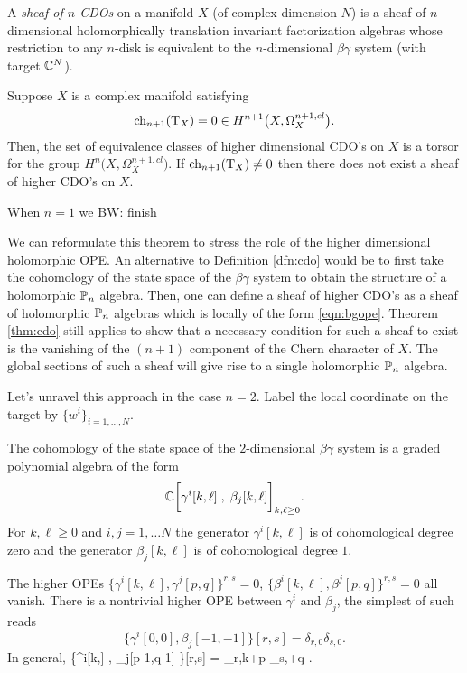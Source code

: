 \documentclass[11pt]{amsart}
\def\brian#1{{\textcolor{blue!65!red}{BW: {#1}}}}
\begin{document}
\begin{dfn}\label{dfn:cdo}
A {\em sheaf of $n$-CDOs} on a manifold $X$ (of complex dimension $N$) is a sheaf of $n$-dimensional holomorphically translation invariant factorization algebras whose restriction to any $n$-disk is equivalent to the $n$-dimensional $\beta\gamma$ system (with target $\mathbb C^N$). 
\end{dfn}

\begin{thm}\label{thm:cdo}
Suppose $X$ is a complex manifold satisfying 
\[
{\rm ch}_{n+1} ({\rm T}_X) = 0 \in H^{n+1} \big(X , \Omega^{n+1,cl}_X\big).
\]
Then, the set of equivalence classes of higher dimensional CDO's on $X$ is a torsor for the group $H^n \big(X , \Omega^{n+1, cl}_X\big)$. 
If ${\rm ch}_{n+1}({\rm T}_X) \ne 0$ then there does not exist a sheaf of higher CDO's on $X$. 
\end{thm}

\begin{rmk}
When $n=1$ we \cite{GGW} \brian{finish}
\end{rmk} 

We can reformulate this theorem to stress the role of the higher dimensional holomorphic OPE. 
An alternative to Definition \ref{dfn:cdo} would be to first take the cohomology of the state space of the $\beta\gamma$ system to obtain the structure of a holomorphic $\mathbb P_n$ algebra.
Then, one can define a sheaf of higher CDO's as a sheaf of holomorphic $\mathbb P_n$ algebras which is locally of the form \eqref{eqn:bgope}. 
Theorem \ref{thm:cdo} still applies to show that a necessary condition for such a sheaf to exist is the vanishing of the $(n+1)$ component of the Chern character of $X$. 
The global sections of such a sheaf will give rise to a single holomorphic $\mathbb P_n$ algebra. 


Let's unravel this approach in the case $n=2$. 
Label the local coordinate on the target by $\{w^i\}_{i=1,\ldots,N}$. 

The cohomology of the state space of the $2$-dimensional $\beta\gamma$ system is a graded polynomial algebra of the form
\[
\mathbb C\bigg[\gamma^i[k,\ell] \; , \; \beta_j [k,\ell] \bigg]_{k,\ell \geq 0} .
\]
For $k,\ell \geq 0$ and $i,j=1,\ldots N$ the generator $\gamma^i[k,\ell]$ is of cohomological degree zero and the generator $\beta_j[k,\ell]$ is of cohomological degree $1$.

The higher OPEs $\{\gamma^i[k,\ell], \gamma^j [p,q]\}^{r,s} = 0$, $\{\beta^i[k,\ell], \beta^j [p,q]\}^{r,s} = 0$ all vanish. 
There is a nontrivial higher OPE between $\gamma^i$ and $\beta_j$, the simplest of such reads
\[
\big\{\gamma^i[0,0] , \beta_j[-1,-1] \big\}[r,s] = \delta_{r,0} \delta_{s,0} .
\]
In general, 
\beqn\label{eqn:bgope}
\big\{\gamma^i[k,\ell] , \beta_j[p-1,q-1] \big\}[r,s] = \delta_{r,k+p} \delta_{s,\ell+q} .
\eeqn
\end{document}
